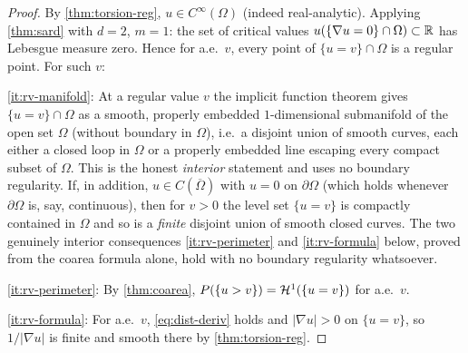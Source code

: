 \begin{proof}
By \cref{thm:torsion-reg}, $u\in C^\infty(\Omega)$ (indeed real-analytic).
Applying \cref{thm:sard} with $d=2$, $m=1$: the set of critical values
$u(\{\nabla u=0\}\cap\Omega)\subset\mathbb{R}$ has Lebesgue measure zero.  Hence for
a.e.\ $v$, every point of $\{u=v\}\cap\Omega$ is a regular point.  For such $v$:

\ref{it:rv-manifold}: At a regular value $v$ the implicit function theorem
gives $\{u=v\}\cap\Omega$ as a smooth, properly embedded $1$-dimensional
submanifold of the open set $\Omega$ (without boundary in $\Omega$), i.e.\ a
disjoint union of smooth curves, each either a closed loop in $\Omega$ or a
properly embedded line escaping every compact subset of $\Omega$.  This is the
honest \emph{interior} statement and uses no boundary regularity.  If, in
addition, $u\in C(\overline\Omega)$ with $u=0$ on $\partial\Omega$ (which
holds whenever $\partial\Omega$ is, say, continuous), then for $v>0$ the level
set $\{u=v\}$ is compactly contained in $\Omega$ and so is a \emph{finite}
disjoint union of smooth closed curves.  The two genuinely interior
consequences \ref{it:rv-perimeter} and \ref{it:rv-formula} below, proved from
the coarea formula alone, hold with no boundary regularity whatsoever.

\ref{it:rv-perimeter}: By \cref{thm:coarea},
$P(\{u>v\})=\mathcal{H}^1(\{u=v\})$ for a.e.\ $v$.

\ref{it:rv-formula}: For a.e.\ $v$, \eqref{eq:dist-deriv} holds and
$|\nabla u|>0$ on $\{u=v\}$, so $1/|\nabla u|$ is finite and smooth there by
\cref{thm:torsion-reg}.
\end{proof}
